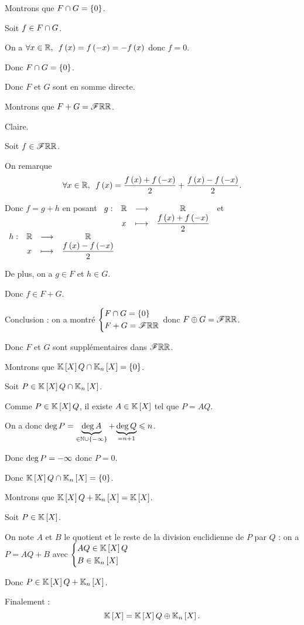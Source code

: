 \begin{dem}[2]
Montrons que \(F\cap G=\left\lbrace0\right\rbrace\).

Soit \(f\in F\cap G\).

On a \(\quantifs{\forall x\in\R}f\paren{x}=f\paren{-x}=-f\paren{x}\) donc \(f=0\).

Donc \(F\cap G=\left\lbrace0\right\rbrace\).

Donc \(F\) et \(G\) sont en somme directe.

Montrons que \(F+G=\mathscr{F}{\mathbb{R}}{\mathbb{R}}\).

\incdir Claire.

\increc

Soit \(f\in\mathscr{F}{\mathbb{R}}{\mathbb{R}}\).

On remarque \[\quantifs{\forall x\in\R}f\paren{x}=\dfrac{f\paren{x}+f\paren{-x}}{2}+\dfrac{f\paren{x}-f\paren{-x}}{2}.\]

Donc \(f=g+h\) en posant \(\begin{array}[t]{cccc}g : & \mathbb{R} & \longrightarrow & \mathbb{R} \\ & x & \longmapsto & \dfrac{f\left(x\right)+f\left(-x\right)}{2}\end{array}\) et \(\begin{array}[t]{cccc}h : & \mathbb{R} & \longrightarrow & \mathbb{R} \\ & x & \longmapsto & \dfrac{f\left(x\right)-f\left(-x\right)}{2}\end{array}\)

De plus, on a \(g\in F\) et \(h\in G\).

Donc \(f\in F+G\).

Conclusion : on a montré \(\begin{dcases}F\cap G=\left\lbrace0\right\rbrace \\ F+G=\mathscr{F}{\mathbb{R}}{\mathbb{R}}\end{dcases}\) donc \(F\oplus G=\mathscr{F}{\mathbb{R}}{\mathbb{R}}\).

Donc \(F\) et \(G\) sont supplémentaires dans \(\mathscr{F}{\mathbb{R}}{\mathbb{R}}\).
\end{dem}

\begin{dem}[3]
Montrons que \(\poly Q\inter\polydeg{n}=\accol{0}\).

Soit \(P\in\poly Q\inter\polydeg{n}\).

Comme \(P\in\poly Q\), il existe \(A\in\poly\) tel que \(P=AQ\).

On a donc \(\deg P=\underbrace{\deg A}_{\in\mathbb{N}\cup\left\lbrace-\infty\right\rbrace}+\underbrace{\deg Q}_{=n+1}\leqslant n\).

Donc \(\deg P=-\infty\) donc \(P=0\).

Donc \(\poly Q\inter\polydeg{n}=\accol{0}\).

Montrons que \(\poly Q+\polydeg{n}=\poly\).

Soit \(P\in\poly\).

On note \(A\) et \(B\) le quotient et le reste de la division euclidienne de \(P\) par \(Q\) : on a \(P=AQ+B\) avec \(\begin{dcases}AQ\in\poly Q \\ B\in\polydeg{n}\end{dcases}\)

Donc \(P\in\poly Q+\polydeg{n}\).

Finalement : \[\poly=\poly Q\oplus\polydeg{n}.\]
\end{dem}


